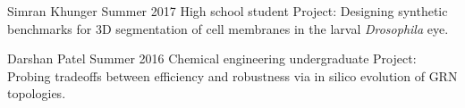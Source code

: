 
\begin{cventries}


  \cventrynew
	{Simran Khunger}    
    {Summer 2017} 
    {High school student}
    {Project: Designing synthetic benchmarks for 3D segmentation of cell membranes in the larval \emph{Drosophila} eye.} 
    
  \cventrynew
	{Darshan Patel}    
    {Summer 2016} 
    {Chemical engineering undergraduate}
    {Project: Probing tradeoffs between efficiency and robustness via in silico evolution of GRN topologies.} 

\end{cventries}
